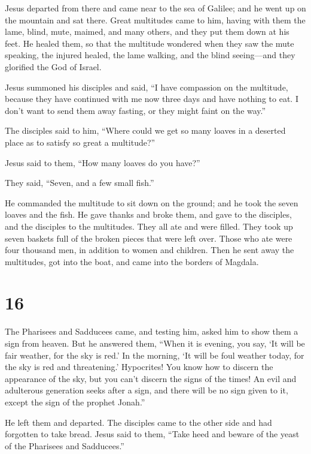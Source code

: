  Jesus departed from there and came near to the sea of
Galilee; and he went up on the mountain and sat there. 
Great multitudes came to him, having with them the lame, blind, mute,
maimed, and many others, and they put them down at his feet. He healed
them,  so that the multitude wondered when they saw the
mute speaking, the injured healed, the lame walking, and the blind
seeing---and they glorified the God of Israel.

 Jesus summoned his disciples and said, ``I have compassion
on the multitude, because they have continued with me now three days and
have nothing to eat. I don't want to send them away fasting, or they
might faint on the way.''

 The disciples said to him, ``Where could we get so many
loaves in a deserted place as to satisfy so great a multitude?''

 Jesus said to them, ``How many loaves do you have?''

They said, ``Seven, and a few small fish.''

 He commanded the multitude to sit down on the ground;
 and he took the seven loaves and the fish. He gave thanks
and broke them, and gave to the disciples, and the disciples to the
multitudes.  They all ate and were filled. They took up
seven baskets full of the broken pieces that were left over.
 Those who ate were four thousand men, in addition to women
and children.  Then he sent away the multitudes, got into
the boat, and came into the borders of Magdala.

\hypertarget{section-15}{%
\section{16}\label{section-15}}

 The Pharisees and Sadducees came, and testing him, asked
him to show them a sign from heaven.  But he answered them,
``When it is evening, you say, `It will be fair weather, for the sky is
red.'  In the morning, `It will be foul weather today, for
the sky is red and threatening.' Hypocrites! You know how to discern the
appearance of the sky, but you can't discern the signs of the times!
 An evil and adulterous generation seeks after a sign, and
there will be no sign given to it, except the sign of the prophet
Jonah.''

He left them and departed.  The disciples came to the other
side and had forgotten to take bread.  Jesus said to them,
``Take heed and beware of the yeast of the Pharisees and Sadducees.''

